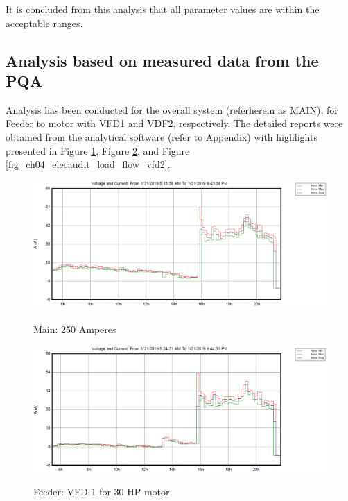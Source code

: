 It is concluded from this analysis that all parameter values are within the acceptable ranges.

%


\subsection{Analysis based on measured data from the PQA}
Analysis has been conducted for the overall system (referherein as MAIN), for Feeder to motor with VFD1 and VDF2, respectively. The detailed reports were obtained from the analytical software (refer to Appendix) with highlights presented in Figure \ref{fig_ch04_elecaudit_load_flow_main}, Figure \ref{fig_ch04_elecaudit_load_flow_vfd1}, and Figure \ref{fig_ch04_elecaudit_load_flow_vfd2}.

\begin{figure}[!htb]
	\includegraphics[width=\textwidth]{figures/fig_ch04_elecaudit_load_flow_main.pdf} \\
	\caption{Main: 250 Amperes}
	\label{fig_ch04_elecaudit_load_flow_main} 
\end{figure}

\begin{figure}[!htb]
	\includegraphics[width=\textwidth]{figures/fig_ch04_elecaudit_load_flow_vfd1.pdf} \\
	\caption{Feeder: VFD-1 for 30 HP motor}
	\label{fig_ch04_elecaudit_load_flow_vfd1} 
\end{figure}



